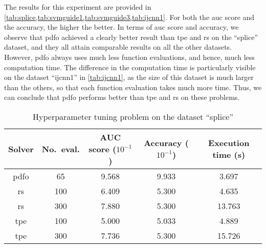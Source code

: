 The results for this experiment are provided in \cref{tab:splice,tab:svmguide1,tab:svmguide3,tab:ijcnn1}.
For both the \gls{auc} score and the accuracy, the higher the better.
In terms of \gls{auc} score and accuracy, we observe that \gls{pdfo} achieved a clearly better result than \gls{tpe} and \gls{rs} on the \enquote{splice} dataset, and they all attain comparable results on all the other datasets.
However, \gls{pdfo} always uses much less function evaluations, and hence, much less computation time.
The difference in the computation time is particularly visible on the dataset \enquote{ijcnn1} in \cref{tab:ijcnn1}, as the size of this dataset is much larger than the others, so that each function evaluation takes much more time.
Thus, we can conclude that \gls{pdfo} performs better than \gls{tpe} and \gls{rs} on these problems.

\begin{table}[!ht]
    \caption{Hyperparameter tuning problem on the dataset \enquote{splice}}
    \label{tab:splice}
    \centering
    \begin{tabular}{cS[table-parse-only]SSS}
        \toprule
        Solver      & {No.\ eval.}  & {AUC score ($10^{-1}$)}   & {Accuracy ($10^{-1}$)}    & {Execution time (\si{\second})}\\
        \midrule
        \gls{pdfo}  & 65            & 9.568                     & 9.933                     & 3.697\\
        \gls{rs}    & 100           & 6.409                     & 5.300                     & 4.635\\
        \gls{rs}    & 300           & 7.880                     & 5.300                     & 13.763\\
        \gls{tpe}   & 100           & 5.000                     & 5.033                     & 4.889\\
        \gls{tpe}   & 300           & 7.736                     & 5.300                     & 15.726\\
        \bottomrule
    \end{tabular}
\end{table}

